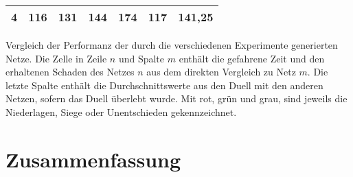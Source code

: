 \documentclass[11pt,final,journal,a4paper,towside,towcolumn]{IEEEtran}
\begin{document}
\begin{table}
\begin{tabular}{|c|c|c|c|c|c|c|}
		\multirow{-2}{*}{4} & \cellcolor[HTML]{9AFF99}116                         & \cellcolor[HTML]{9AFF99}131  & \cellcolor[HTML]{9AFF99}144  & \cellcolor[HTML]{FFCCC9}174  & \cellcolor[HTML]{C0C0C0}117  & \cellcolor[HTML]{C0C0C0}141,25  \\ \hline 
	\end{tabular}
\caption{}{Vergleich der Performanz der durch die verschiedenen Experimente generierten Netze. Die Zelle in Zeile $n$ und Spalte $m$ enthält die gefahrene Zeit und den erhaltenen Schaden des Netzes $n$ aus dem direkten Vergleich zu Netz $m$. Die letzte Spalte enthält die Durchschnittswerte aus den Duell mit den anderen Netzen, sofern das Duell überlebt wurde. Mit rot, grün und grau, sind jeweils die Niederlagen, Siege oder Unentschieden gekennzeichnet.}
\end{table}
\section{Zusammenfassung}

{}

\end{document}
